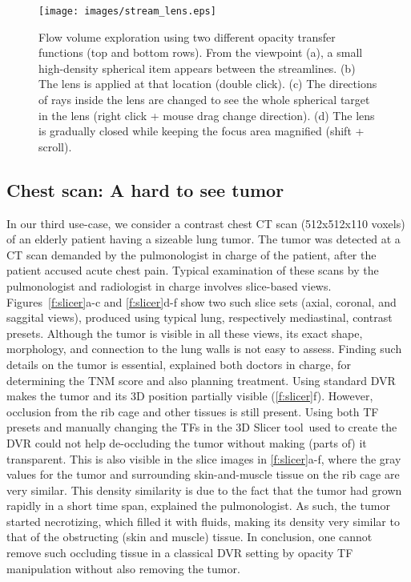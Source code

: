 \begin{figure}[htb]
\texttt{[image: images/stream\_lens.eps]}
\caption{Flow volume exploration using two different opacity transfer functions (top and bottom rows). From the viewpoint (a), a small high-density spherical item appears between the streamlines. (b) The lens is applied at that location (double click). (c) The directions of rays inside the lens are changed to see the whole spherical target in the lens (right click + mouse drag change direction). (d) The lens is gradually closed while keeping the focus area magnified (shift + scroll).}
\label{f:stream_lens}
\end{figure}

\subsection{Chest scan: A hard to see tumor}
\label{sec:chest}
%
In our third use-case, we consider a contrast chest CT scan (512x512x110 voxels) of an elderly patient having a sizeable lung tumor. The tumor was detected at a CT scan demanded by the pulmonologist in charge of the patient, after the patient accused acute chest pain. Typical examination of these scans by the pulmonologist and radiologist in charge involves slice-based views. Figures~\ref{f:slicer}a-c and \ref{f:slicer}d-f show two such slice sets (axial, coronal, and saggital views), produced using typical lung, respectively mediastinal, contrast presets. Although the tumor is visible in all these views, its exact shape, morphology, and connection to the lung walls is not easy to assess. Finding such details on the tumor is essential, explained both doctors in charge, for determining the TNM score and also planning treatment. Using standard DVR makes the tumor and its 3D position partially visible (\autoref{f:slicer}f). However, occlusion from the rib cage and other tissues is still present. Using both TF presets and manually changing the TFs in the 3D Slicer tool\,\cite{slicer} used to create the DVR could not help de-occluding the tumor without making (parts of) it transparent. This is also visible in the slice images in \autoref{f:slicer}a-f, where the gray values for the tumor and surrounding skin-and-muscle tissue on the rib cage are very similar. 
This density similarity is due to the fact that the tumor had grown rapidly in a short time span, explained the pulmonologist. As such, the tumor started necrotizing, which filled it with fluids, making its density very similar to that of the obstructing (skin and muscle) tissue. In conclusion, one cannot remove such occluding tissue in a classical DVR setting by opacity TF manipulation without also removing the tumor.

